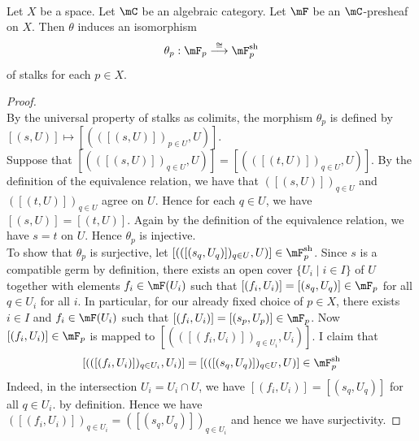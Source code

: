 \documentclass[a4paper]{article}
\begin{document}
\begin{lmm}{}{}\\
Let $X$ be a space. Let $\mC$ be an algebraic category. Let $\mF$ be an $\mC$-presheaf on $X$. Then $\theta$ induces an isomorphism $$\theta_p:\mF_p\overset{\cong}{\longrightarrow}\mF_p^\text{sh}$$ of stalks for each $p\in X$. 
\begin{proof}\\
By the universal property of stalks as colimits, the morphism $\theta_p$ is defined by $[(s,U)]\mapsto[(([(s,U)])_{p\in U},U)]$. \\

Suppose that $[(([(s,U)])_{q\in U},U)]=[(([(t,U)])_{q\in U},U)]$. By the definition of the equivalence relation, we have that $([(s,U)])_{q\in U}$ and $([(t,U)])_{q\in U}$ agree on $U$. Hence for each $q\in U$, we have $[(s,U)]=[(t,U)]$. Again by the definition of the equivalence relation, we have $s=t$ on $U$. Hence $\theta_p$ is injective. \\

To show that $\theta_p$ is surjective, let $[(([(s_q,U_q)])_{q\in U},U)]\in\mF_p^\text{sh}$. Since $s$ is a compatible germ by definition, there exists an open cover $\{U_i\;|\;i\in I\}$ of $U$ together with elements $f_i\in\mF(U_i)$ such that $[(f_i,U_i)]=[(s_q,U_q)]\in\mF_p$ for all $q\in U_i$ for all $i$. In particular, for our already fixed choice of $p\in X$, there exists $i\in I$ and $f_i\in\mF(U_i)$ such that $[(f_i,U_i)]=[(s_p,U_p)]\in\mF_p$. Now $[(f_i,U_i)]\in\mF_p$ is mapped to $[(([(f_i,U_i)])_{q\in U_i},U_i)]$. I claim that $$[(([(f_i,U_i)])_{q\in U_i},U_i)]=[(([(s_q,U_q)])_{q\in U},U)]\in\mF_p^\text{sh}$$ Indeed, in the intersection $U_i=U_i\cap U$, we have $[(f_i,U_i)]=[(s_q,U_q)]$ for all $q\in U_i$. by definition. Hence we have $([(f_i,U_i)])_{q\in U_i}=([(s_q,U_q)])_{q\in U_i}$ and hence we have surjectivity. 
\end{proof}
\end{lmm}
\end{document}
